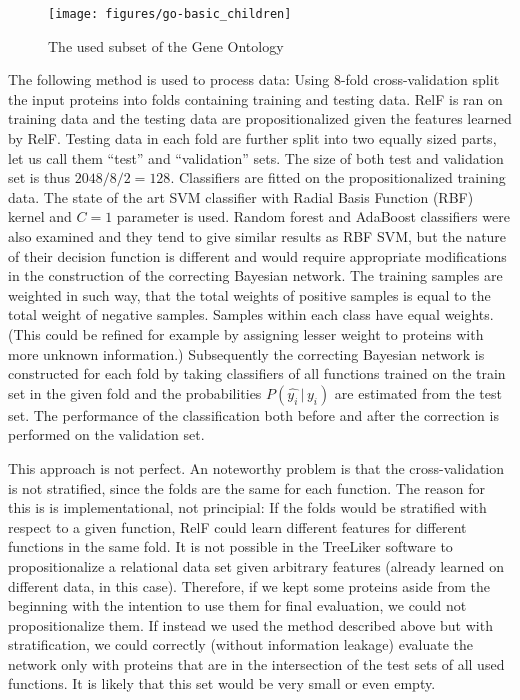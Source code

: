 \documentclass[11pt,twoside,a4paper]{book}
\begin{document}
\begin{landscape}
\begin{figure}[h]
\begin{center}
\texttt{[image: figures/go-basic\_children]}
\caption{The used subset of the Gene Ontology}
\label{fig:go}
\end{center}
\end{figure}
\end{landscape}

The following method is used to process data:
Using 8-fold cross-validation split the input proteins into folds
containing training and testing data.
RelF is ran on training data and the testing 
data are propositionalized given the features learned by RelF.
Testing data in each fold are further split into two equally sized parts,
let us call them ``test'' and ``validation'' sets.
The size of both test and validation set is thus $2048 / 8 / 2 =  128$.
Classifiers are fitted on the propositionalized training data.
The state of the art SVM classifier with Radial Basis Function (RBF)
kernel and $C = 1$ parameter is used.
Random forest and AdaBoost classifiers were also examined 
and they tend to give similar results as RBF SVM,
but the nature of their decision function is different
and would require appropriate modifications in the construction of the 
correcting Bayesian network.
The training samples are weighted in such way, that the total weights
of positive samples is equal to the total weight of negative samples.
Samples within each class have equal weights. 
(This could be refined for example by assigning lesser weight
to proteins with more unknown information.)
Subsequently the correcting Bayesian network is constructed
for each fold by taking classifiers of all functions trained
on the train set in the given fold
and the probabilities $P(\hat{y_i}\,|\,y_i)$ are estimated from the test set.
The performance of the classification both before and after the correction
is performed on the validation set.

This approach is not perfect. 
An noteworthy problem is that the cross-validation is not stratified,
since the folds are the same for each function.
The reason for this is is implementational, not principial:
If the folds would be stratified with respect to a given 
function, RelF could learn different features for different functions
in the same fold.
It is not possible in the TreeLiker software to 
propositionalize a relational data set given arbitrary features
(already learned on different data, in this case).
Therefore, if we kept some proteins aside from the beginning 
with the intention to use them for final evaluation,
we could not propositionalize them.
If instead we used the method described above but with stratification,
we could correctly (without information leakage) evaluate the network only with proteins
that are in the intersection of the test sets of all used functions.
It is likely that this set would be very small or even empty.
\end{document}
